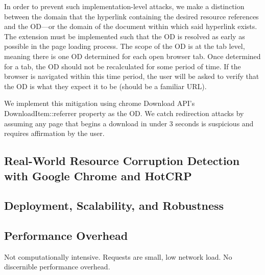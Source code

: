 In order to prevent such implementation-level attacks, we make a distinction
between the domain that the hyperlink containing the desired resource references
and the OD---or the domain of the document within which said hyperlink exists.
The extension must be implemented such that the OD is resolved as early as
possible in the page loading process. The scope of the OD is at the tab level,
meaning there is one OD determined for each open browser tab. Once determined
for a tab, the OD should not be recalculated for some period of time. If the
browser is navigated within this time period, the user will be asked to verify
that the OD is what they expect it to be (should be a familiar URL).

We implement this mitigation using chrome Download API's DownloadItem::referrer
property as the OD. We catch redirection attacks by assuming any page that
begins a download in under 3 seconds is suspicious and requires affirmation by
the user.


\subsection{Real-World Resource Corruption Detection with Google Chrome and HotCRP}



\subsection{Deployment, Scalability, and Robustness}



\subsection{Performance Overhead}


Not computationally intensive. Requests are small, low network load. No
discernible performance overhead.
